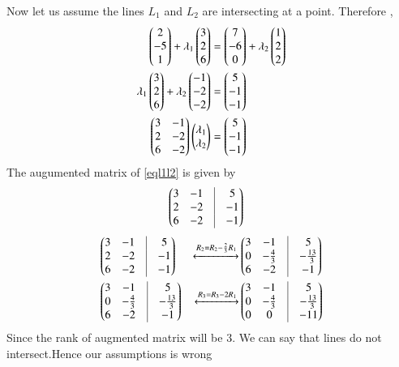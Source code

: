\documentclass[journal,12pt,twocolumn]{IEEEtran}
\begin{document}
Now let us assume the lines $L_1$ and $L_2$ are intersecting at a point. Therefore , 
\begin{align}
\begin{pmatrix}2\\-5\\1\end{pmatrix}+\lambda_1\begin{pmatrix}3\\2\\6\end{pmatrix}&=\begin{pmatrix}7\\-6\\0\end{pmatrix}+\lambda_2\begin{pmatrix}1\\2\\2\end{pmatrix}\\
\lambda_1\begin{pmatrix}3\\2\\6\end{pmatrix}+\lambda_2\begin{pmatrix}-1\\-2\\-2\end{pmatrix}&=\begin{pmatrix}5\\-1\\-1\end{pmatrix}\\
\begin{pmatrix}3 & -1\\2 & -2\\6 & -2\end{pmatrix}\begin{pmatrix}\lambda_1 \\ \lambda_2\end{pmatrix}&=\begin{pmatrix}5\\-1\\-1\end{pmatrix}\label{eql1l2}
\end{align}
The augumented matrix of \eqref{eql1l2} is given by 
\begin{align}
    &\myvec{3 & -1 &\vrule & 5 \\ 2 & -2 & \vrule& -1\\ 6 & -2 &\vrule & -1}\label{eqaug}
\end{align}
\begin{align}
&\myvec{3 & -1 &\vrule & 5 \\ 2 & -2 & \vrule& -1\\ 6 & -2 &\vrule & -1}&\xleftrightarrow{R_2=R_2-\frac{2}{3}R_1}&\myvec{3 & -1 &\vrule & 5 \\ 0 & -\frac{4}{3} & \vrule& -\frac{13}{3}\\ 6 & -2 &\vrule & -1}\\
&\myvec{3 & -1 &\vrule & 5 \\ 0 & -\frac{4}{3} & \vrule& -\frac{13}{3}\\ 6 & -2 &\vrule & -1}&\xleftrightarrow{R_3=R_3-2R_1}&\myvec{3 & -1 &\vrule & 5 \\ 0 & -\frac{4}{3} & \vrule& -\frac{13}{3}\\ 0 & 0 &\vrule & -11}\label{augfin}
\end{align}
Since the rank of augmented matrix will be 3. We can say that lines do not intersect.Hence our assumptions is wrong
\end{document}
